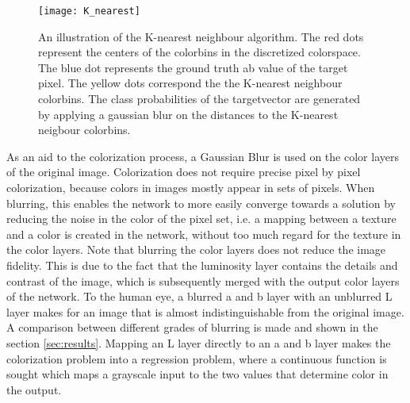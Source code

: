 \begin{wrapfigure}{R}{0.5\textwidth}
	\vspace{-20pt}
	\begin{center}
		\texttt{[image: K\_nearest]}
	\end{center}
	\caption{An illustration of the K-nearest neighbour algorithm. The red dots represent the centers of the colorbins in the discretized colorspace. The blue dot represents the ground truth ab value of the target pixel. The yellow dots correspond the the K-nearest neighbour colorbins. The class probabilities of the targetvector are generated by applying a gaussian blur on the distances to the K-nearest neigbour colorbins.}
	\vspace{0pt}
	\label{fig:k_nearest}
\end{wrapfigure}

As an aid to the colorization process, a Gaussian Blur is used on the color layers of the original image. Colorization does not require precise pixel by pixel colorization, because colors in images mostly appear in sets of pixels. When blurring, this enables the network to more easily converge towards a solution by reducing the noise in the color of the pixel set, i.e. a mapping between a texture and a color is created in the network, without too much regard for the texture in the color layers. Note that blurring the color layers does not reduce the image fidelity. This is due to the fact that the luminosity layer contains the details and contrast of the image, which is subsequently merged with the output color layers of the network. To the human eye, a blurred a and b layer with an unblurred L layer makes for an image that is almost indistinguishable from the original image. A comparison between different grades of blurring is made and shown in the section \ref{sec:results}. Mapping an L layer directly to an a and b layer makes the colorization problem into a regression problem, where a continuous function is sought which maps a grayscale input to the two values that determine color in the output.

